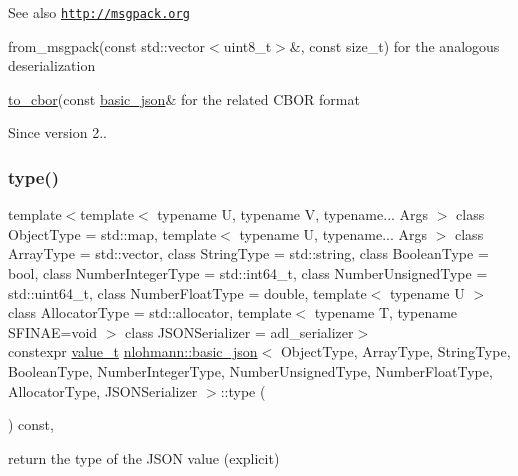 \begin{DoxySeeAlso}{See also}
\href{http://msgpack.org}{\tt http\+://msgpack.\+org} 

from\+\_\+msgpack(const std\+::vector$<$uint8\+\_\+t$>$\&, const size\+\_\+t) for the analogous deserialization 

\mbox{\hyperlink{classnlohmann_1_1basic__json_a2566783e190dec524bf3445b322873b8}{to\+\_\+cbor}}(const \mbox{\hyperlink{classnlohmann_1_1basic__json}{basic\+\_\+json}}\& for the related C\+B\+OR format
\end{DoxySeeAlso}
\begin{DoxySince}{Since}
version 2.. 
\end{DoxySince}
\mbox{\label{classnlohmann_1_1basic__json_a2b2d781d7f2a4ee41bc0016e931cadf7}} 
\subsubsection{\texorpdfstring{type()}{type()}}
{\footnotesize\ttfamily template$<$template$<$ typename U, typename V, typename... Args $>$ class Object\+Type = std\+::map, template$<$ typename U, typename... Args $>$ class Array\+Type = std\+::vector, class String\+Type  = std\+::string, class Boolean\+Type  = bool, class Number\+Integer\+Type  = std\+::int64\+\_\+t, class Number\+Unsigned\+Type  = std\+::uint64\+\_\+t, class Number\+Float\+Type  = double, template$<$ typename U $>$ class Allocator\+Type = std\+::allocator, template$<$ typename T, typename S\+F\+I\+N\+A\+E=void $>$ class J\+S\+O\+N\+Serializer = adl\+\_\+serializer$>$ \\
constexpr \mbox{\hyperlink{namespacenlohmann_1_1detail_a90aa5ef615aa8305e9ea20d8a947980f}{value\+\_\+t}} \mbox{\hyperlink{classnlohmann_1_1basic__json}{nlohmann\+::basic\+\_\+json}}$<$ Object\+Type, Array\+Type, String\+Type, Boolean\+Type, Number\+Integer\+Type, Number\+Unsigned\+Type, Number\+Float\+Type, Allocator\+Type, J\+S\+O\+N\+Serializer $>$\+::type (\begin{DoxyParamCaption}{ }\end{DoxyParamCaption}) const\hspace{0.3cm}{\ttfamily [inline]}, {\ttfamily [noexcept]}}



return the type of the J\+S\+ON value (explicit) 

